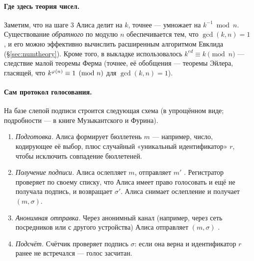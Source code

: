 \paragraph*{Где здесь теория чисел.} Заметим, что на шаге 3 Алиса делит на $k$, точнее --- умножает на $k^{-1} \bmod n$. Существование \emph{обратного} по модулю $n$ обеспечивается тем, что $\gcd(k, n) = 1$, и его можно эффективно вычислить расширенным алгоритмом Евклида (§\ref{sec:numtheory}). Кроме того, в выкладке использовалось $k^{ed} \equiv k \pmod n$ --- следствие малой теоремы Ферма (точнее, её обобщения --- теоремы Эйлера, гласящей, что $k^{\varphi(n)} \equiv 1 \pmod n$ для $\gcd(k, n) = 1$).

\paragraph*{Сам протокол голосования.} На базе слепой подписи строится следующая схема (в упрощённом виде; подробности --- в книге Музыкантского и Фурина).

\begin{algorithmbox}[title={Алгоритм: электронное голосование}]
\begin{enumerate}
  \item \emph{Подготовка.} Алиса формирует бюллетень $m$ --- например, число, кодирующее её выбор, плюс случайный «уникальный идентификатор» $r$, чтобы исключить совпадение бюллетеней.
  \item \emph{Получение подписи.} Алиса ослепляет $m$, отправляет $m'$ . Регистратор проверяет по своему списку, что Алиса имеет право голосовать и ещё не получала подпись, и возвращает $\sigma'$. Алиса снимает ослепление и получает $(m, \sigma)$.
  \item \emph{Анонимная отправка.} Через анонимный канал (например, через сеть посредников или с другого устройства) Алиса отправляет $(m, \sigma)$ .
  \item \emph{Подсчёт.} Счётчик проверяет подпись $\sigma$: если она верна и идентификатор $r$ ранее не встречался --- голос засчитан.
\end{enumerate}
\end{algorithmbox}


